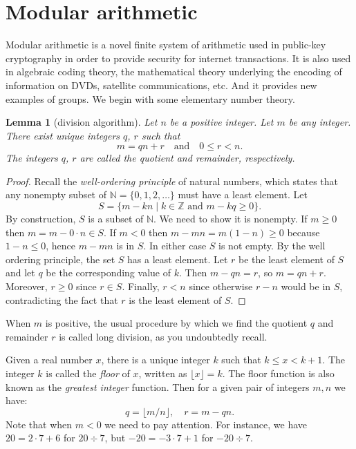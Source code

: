 \documentclass[11pt]{article}
\newtheorem{lem}[thm]{Lemma}
\theoremstyle{definition}
\newcommand{\Z}{\mathbb{Z}} %
\newcommand{\N}{\mathbb{N}} %
\begin{document}
\setcounter{section}{10}


\section{Modular arithmetic}\noindent
Modular arithmetic is a novel finite system of arithmetic used in
public-key cryptography in order to provide
security for internet transactions. It is also used in algebraic
coding theory, the mathematical theory underlying the encoding of
information on DVDs, satellite communications, etc. And it provides
new examples of groups. We begin with some elementary number theory.

\begin{lem}[division algorithm]
Let $n$ be a positive integer.  Let $m$ be any integer.
There exist unique integers $q$, $r$ such that
\[
m = qn + r \quad\text{and}\quad 0 \le r < n. 
\]
The integers $q$, $r$ are called the {\em quotient} and {\em
  remainder}, respectively.
\end{lem}

\begin{proof}
Recall the \emph{well-ordering principle} of natural numbers, which
states that any nonempty subset of $\N = \{0,1,2,\dots\}$ must have a
least element. Let
\[
  S = \{ m - kn \mid k \in \Z \text{ and } m - kq \ge 0 \}.
\]
By construction, $S$ is a subset of $\N$. We need to show it is
nonempty. If $m \ge 0$ then $m = m-0\cdot n \in S$. If $m < 0$ then
$m-mn = m(1-n) \ge 0$ because $1-n \le 0$, hence $m-mn$ is in $S$. In
either case $S$ is not empty. By the well ordering principle, the set
$S$ has a least element. Let $r$ be the least element of $S$ and let
$q$ be the corresponding value of $k$. Then $m - qn = r$, so $m =
qn+r$. Moreover, $r \ge 0$ since $r \in S$. Finally, $r < n$ since
otherwise $r-n$ would be in $S$, contradicting the fact that $r$ is
the least element of $S$.
\end{proof}

When $m$ is positive, the usual procedure by which we find the
quotient $q$ and remainder $r$ is called long division, as you
undoubtedly recall. 

Given a real number $x$, there is a unique integer $k$ such that $k
\le x < k+1$. The integer $k$ is called the \emph{floor}
of $x$, written as $\lfloor x \rfloor = k$. The floor function is also
known as the \emph{greatest integer} function.  Then for a given pair
of integers $m,n$ we have:
\[
  q = \lfloor m/n \rfloor, \quad r = m-qn.
\]
Note that when $m<0$ we need to pay attention. For instance, we have
$20 = 2 \cdot 7 + 6$ for $20 \div 7$, but $-20 = -3 \cdot 7 + 1$ for
$-20 \div 7$. 
\end{document}

